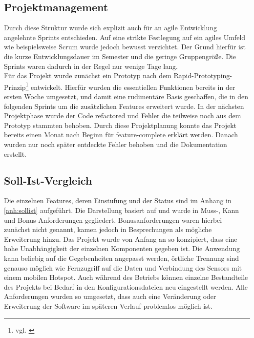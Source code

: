 \subsection{Projektmanagement}
Durch diese Struktur wurde sich explizit auch für an agile Entwicklung angelehnte Sprints entschieden.
Auf eine strikte Festlegung auf ein agiles Umfeld wie beispielsweise Scrum wurde jedoch bewusst verzichtet.
Der Grund hierfür ist die kurze Entwicklungsdauer im Semester und die geringe Gruppengröße.
Die Sprints waren dadurch in der Regel nur wenige Tage lang. \\
Für das Projekt wurde zunächst ein Prototyp nach dem Rapid-Prototyping-Prinzip\footnote{vgl. \cite{krypczyk.2019}} entwickelt.
Hierfür wurden die essentiellen Funktionen bereits in der ersten Woche umgesetzt, und damit eine rudimentäre Basis geschaffen, die in den folgenden Sprints um die zusätzlichen Features erweitert wurde.
In der nächsten Projektphase wurde der Code refactored und Fehler die teilweise noch aus dem Prototyp stammten behoben.
Durch diese Projektplanung konnte das Projekt bereits einen Monat nach Beginn für feature-complete erklärt werden.
Danach wurden nur noch später entdeckte Fehler behoben und die Dokumentation erstellt.

\subsection{Soll-Ist-Vergleich}
Die einzelnen Features, deren Einstufung und der Status sind im Anhang in \autoref{anh:sollist} aufgeführt.
Die Darstellung basiert auf \cite{Wortmann.2020} und wurde in Muss-, Kann und Bonus-Anforderungen gegliedert. Bonusanforderungen waren hierbei zunächst nicht genannt, kamen jedoch in Besprechungen als mögliche Erweiterung hinzu.
Das Projekt wurde von Anfang an so konzipiert, dass eine hohe Unabhängigkeit der einzelnen Komponenten gegeben ist.
Die Anwendung kann beliebig auf die Gegebenheiten angepasst werden, örtliche Trennung sind genauso möglich wie Fernzugriff auf die Daten und Verbindung des Sensors mit einem mobilen Hotspot.
Auch während des Betriebs können einzelne Bestandteile des Projekts bei Bedarf in den Konfigurationsdateien neu eingestellt werden.
Alle Anforderungen wurden so umgesetzt, dass auch eine Veränderung oder Erweiterung der Software im späteren Verlauf problemlos möglich ist. 